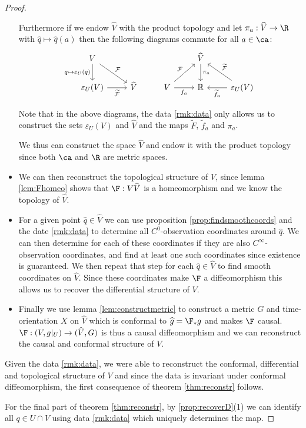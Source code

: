 \begin{proof}
\begin{itemize}
    Furthermore if we endow $\widehat{V}$ with the product topology and let $\pi_a:\widehat{V}\to \R$ with $\widehat{q}\mapsto \widehat{q}(a)$ then the following diagrams commute for all $a\in \ca$:
    \[\begin{tikzcd}
	V &&& {\widehat{V}} \\
	{\varepsilon_U(V)} & {\widehat{V}} & V & {\mathbb{R}} & {\varepsilon_U(V)}
	\arrow["{\mathcal{F}}", from=1-1, to=2-2]
	\arrow["{\widetilde{\mathcal{F}}}"', from=2-1, to=2-2]
	\arrow["{q\mapsto\varepsilon_U(q)}"', from=1-1, to=2-1]
	\arrow["{f_a}"', from=2-3, to=2-4]
	\arrow["{\widetilde{f}_a}", from=2-5, to=2-4]
	\arrow["{\mathcal{F}}", from=2-3, to=1-4]
	\arrow["{\widetilde{\mathcal{F}}}"', from=2-5, to=1-4]
	\arrow["{\pi_a}", from=1-4, to=2-4]
\end{tikzcd}\]

Note that in the above diagrams, the data \ref{rmk:data} only allows us to construct the sets $\varepsilon_U(V)$ and $\widehat{V}$ and the maps $\widetilde{F}$, $\widetilde{f}_a$ and $\pi_a$.

We thus can construct the space $\widehat{V}$ and endow it with the product topology since both $\ca$ and $\R$ are metric spaces.

\item We can then reconstruct the topological structure of $V$, since lemma \ref{lem:Fhomeo} shows that $\F:V\widehat{V}$ is a homeomorphism and we know the topology of $\widehat{V}$.

\item For a given point $\widehat{q}\in \widehat{V}$ we can use proposition \ref{prop:findsmoothcoords} and the date \ref{rmk:data} to determine all $C^0$-observation coordinates around $\widehat{q}$. We can then determine for each of these coordinates if they are also $C^\infty$-observation coordinates, and find at least one such coordinates since existence is guaranteed. We then repeat that step for each $\widehat{q}\in \widehat{V}$ to find smooth coordinates on $\widehat{V}$. Since these coordinates make $\F$ a diffeomorphism this allows us to recover the differential structure of $V$.

\item Finally we use lemma \ref{lem:constructmetric} to construct a metric $G$ and time-orientation $X$ on $\widehat{V}$ which is conformal to $\widehat{g}=\F_*g$ and makes $\F$ causal. 
$\F:(V,g\rvert_U)\to (\widehat{V},G)$ is thus a causal diffeomorphism and we can reconstruct the causal and conformal structure of $V$.
\end{itemize}

Given the data \ref{rmk:data}, we were able to reconstruct the conformal, differential and topological structure of $V$ and since the data is invariant under conformal diffeomorphism, the first consequence of theorem \ref{thm:reconstr} follows.

For the final part of theorem \ref{thm:reconstr}, by \ref{prop:recoverD}(1) we can identify all $q\in U\cap V$ using data \ref{rmk:data} which uniquely determines the map.
\end{proof}

